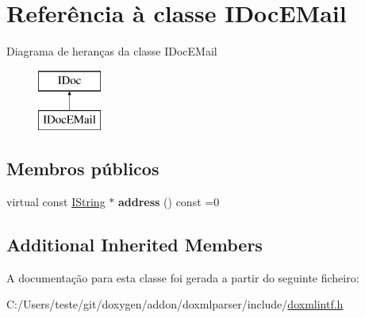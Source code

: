 \hypertarget{class_i_doc_e_mail}{\section{Referência à classe I\-Doc\-E\-Mail}
\label{class_i_doc_e_mail}
}
Diagrama de heranças da classe I\-Doc\-E\-Mail\begin{figure}[H]
\begin{center}
\leavevmode
\includegraphics[height=2.000000cm]{class_i_doc_e_mail}
\end{center}
\end{figure}
\subsection*{Membros públicos}
\begin{DoxyCompactItemize}
\item 
\hypertarget{class_i_doc_e_mail_a416ea585f69784c953f70891a21904aa}{virtual const \hyperlink{class_i_string}{I\-String} $\ast$ {\bfseries address} () const =0}\label{class_i_doc_e_mail_a416ea585f69784c953f70891a21904aa}

\end{DoxyCompactItemize}
\subsection*{Additional Inherited Members}


A documentação para esta classe foi gerada a partir do seguinte ficheiro\-:\begin{DoxyCompactItemize}
\item 
C\-:/\-Users/teste/git/doxygen/addon/doxmlparser/include/\hyperlink{include_2doxmlintf_8h}{doxmlintf.\-h}\end{DoxyCompactItemize}
